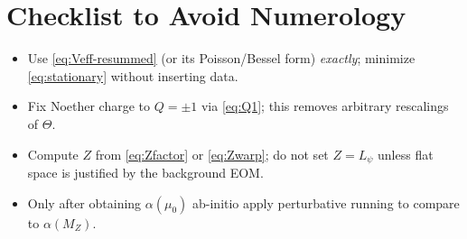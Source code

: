 \documentclass[12pt]{article}
\begin{document}
\section{Checklist to Avoid Numerology}
\begin{itemize}
\item Use \eqref{eq:Veff-resummed} (or its Poisson/Bessel form) \emph{exactly}; minimize \eqref{eq:stationary} without inserting data.
\item Fix Noether charge to $Q=\pm 1$ via \eqref{eq:Q1}; this removes arbitrary rescalings of $\Theta$.
\item Compute $Z$ from \eqref{eq:Zfactor} or \eqref{eq:Zwarp}; do not set $Z=L_\psi$ unless flat space is justified by the background EOM.
\item Only after obtaining $\alpha(\mu_0)$ ab-initio apply perturbative running to compare to $\alpha(M_Z)$.
\end{itemize}
\end{document}
